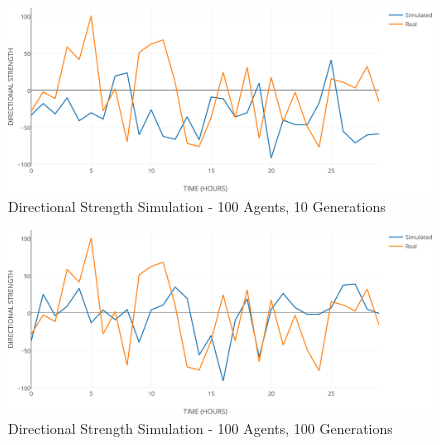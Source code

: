 \documentclass[a4paper,twoside]{article}
\begin{document}



\begin{figure}[h!]
\begin{center}
\includegraphics[width=1.00\columnwidth]{figures/ds-sim-100agents-10gen/ds-sim-100agents-10gen}
\caption{{\label{ds-prediction-10}Directional Strength Simulation - 100 Agents, 10 Generations%
}}
\end{center}
\end{figure}

\begin{figure}[h!]
\begin{center}
\includegraphics[width=1.00\columnwidth]{figures/ds-sim-100agents-100gen/ds-sim-100agents-100gen}
\caption{{\label{ds-prediction-100}Directional Strength Simulation - 100 Agents, 100 Generations%
}}
\end{center}
\end{figure}
\end{document}
